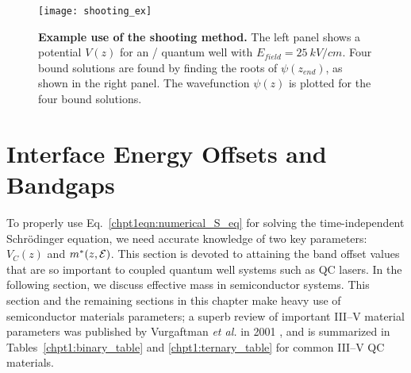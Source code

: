 \documentclass[12pt]{report}
\begin{document}
\begin{figure}[tp]
\centering
\texttt{[image: shooting\_ex]}
\caption[Example use of the shooting method]{{\textbf{Example use of the shooting method.}}  The left panel shows a potential $V(z)$ for an \InGaAs / \AlInAs quantum well with $E_{{field}}=25~{kV/cm}$.  Four bound solutions are found by finding the roots of $\psi(z_{end})$, as shown in the right panel. The wavefunction $\psi(z)$ is plotted for the four bound solutions.}
\label{chpt1:shooting_example}
\end{figure}


\section{Interface Energy Offsets and Bandgaps}

To properly use Eq.~\eqref{chpt1eqn:numerical_S_eq} for solving the time-independent Schr\"{o}dinger equation, we need accurate knowledge of two key parameters: $V_C(z)$ and $m^*(z,\EE)$.  This section is devoted to attaining the band offset values that are so important to coupled quantum well systems such as QC lasers.  In the following section, we discuss effective mass in semiconductor systems.  This section and the remaining sections in this chapter make heavy use of semiconductor materials parameters; a superb review of important III--V material parameters was published by Vurgaftman \emph{et al.} in 2001 \cite{Vurgaftman}, and is summarized in Tables~\ref{chpt1:binary_table} and \ref{chpt1:ternary_table} for common III--V QC materials.
\end{document}
